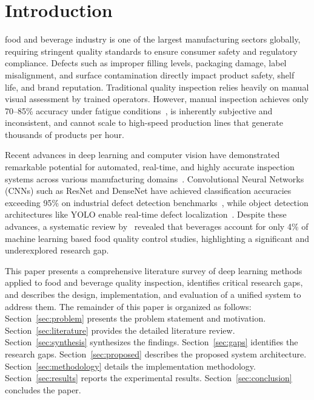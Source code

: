 \documentclass{ieeeaccess}
\begin{document}
\titlepgskip=-15pt

\maketitle

\section{Introduction}
\label{sec:introduction}
 food and beverage industry is one of the largest manufacturing sectors globally, requiring stringent quality standards to ensure consumer safety and regulatory compliance. Defects such as improper filling levels, packaging damage, label misalignment, and surface contamination directly impact product safety, shelf life, and brand reputation. Traditional quality inspection relies heavily on manual visual assessment by trained operators. However, manual inspection achieves only 70--85\% accuracy under fatigue conditions~\cite{thermoforming2021}, is inherently subjective and inconsistent, and cannot scale to high-speed production lines that generate thousands of products per hour.

Recent advances in deep learning and computer vision have demonstrated remarkable potential for automated, real-time, and highly accurate inspection systems across various manufacturing domains~\cite{mlreview2025, smartmfgai2024}. Convolutional Neural Networks (CNNs) such as ResNet and DenseNet have achieved classification accuracies exceeding 95\% on industrial defect detection benchmarks~\cite{resnet50defect2025, defectdetection2024}, while object detection architectures like YOLO enable real-time defect localization~\cite{industrialsystem2025, ijisrt2024}. Despite these advances, a systematic review by~\cite{mlreview2025} revealed that beverages account for only 4\% of machine learning based food quality control studies, highlighting a significant and underexplored research gap.

This paper presents a comprehensive literature survey of deep learning methods applied to food and beverage quality inspection, identifies critical research gaps, and describes the design, implementation, and evaluation of a unified system to address them. The remainder of this paper is organized as follows: Section~\ref{sec:problem} presents the problem statement and motivation. Section~\ref{sec:literature} provides the detailed literature review. Section~\ref{sec:synthesis} synthesizes the findings. Section~\ref{sec:gaps} identifies the research gaps. Section~\ref{sec:proposed} describes the proposed system architecture. Section~\ref{sec:methodology} details the implementation methodology. Section~\ref{sec:results} reports the experimental results. Section~\ref{sec:conclusion} concludes the paper.
\end{document}
